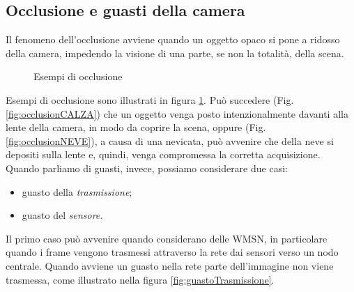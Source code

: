 \subsection{Occlusione e guasti della camera}
Il fenomeno dell'occlusione avviene quando un oggetto opaco si pone a ridosso della camera, impedendo la visione di una parte, se non la totalit\`a, della scena. 
\begin{figure}
	\centering
	\caption{Esempi di occlusione}
	\label{fig:occlusion}
\end{figure}
\noindent Esempi di occlusione sono illustrati in figura \ref{fig:occlusion}. 
Pu\`o succedere (Fig. \ref{fig:occlusionCALZA}) che un oggetto venga posto intenzionalmente davanti alla lente della camera, in modo da coprire la scena, oppure (Fig. \ref{fig:occlusionNEVE}), a causa di una nevicata, pu\`o avvenire che della neve si depositi sulla lente e, quindi, venga compromessa la corretta acquisizione.\\
Quando parliamo di guasti, invece, possiamo considerare due casi:
\begin{itemize}
	\item guasto della \textit{trasmissione};
	\item guasto del \textit{sensore.}
\end{itemize}
Il primo caso pu\`o avvenire quando considerano delle WMSN, in particolare quando i frame vengono trasmessi attraverso la rete dai sensori verso un nodo centrale.
Quando avviene un guasto nella rete parte dell'immagine non viene trasmessa, come illustrato nella figura \ref{fig:guastoTrasmissione}.
